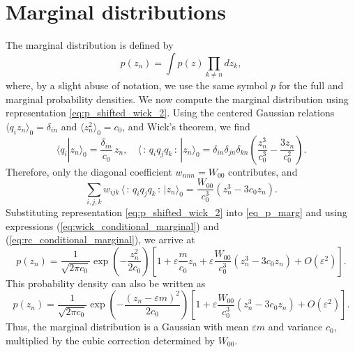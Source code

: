 \documentclass[aps,twocolumn,superscriptaddress]{revtex4-2}
\begin{document}
\section{Marginal distributions}

The marginal distribution is defined by
\begin{equation}
p(z_n)=\int p(z)\prod_{k\ne n}dz_k,
\label{eq_p_marg}
\end{equation}
where, by a slight abuse of notation, we use the same symbol \(p\) for the full and marginal probability densities. We now compute the marginal distribution using representation \eqref{eq:p_shifted_wick_2}.
Using the centered Gaussian relations $\langle q_i z_n\rangle_0=\delta_{in}$ and $\langle z_n^2\rangle_0=c_0$,
and Wick's theorem, we find
\begin{equation}
\langle q_i | z_n\rangle_0=\frac{\delta_{in}}{c_0}\,z_n, \quad
\langle \,{:}\,q_iq_jq_k\,{:} \,| z_n\rangle_0
=
\delta_{in}\delta_{jn}\delta_{kn}
\left(
\frac{z_n^3}{c_0^3}-\frac{3z_n}{c_0^2}
\right).
\label{eq:wick_conditional_marginal}
\end{equation}
Therefore, only the diagonal coefficient \(w_{nnn}=W_{00}\) contributes, and
\begin{equation}
\sum_{i,j,k} w_{ijk}\,
\langle \,{:}\,q_iq_jq_k\,{:}\, | z_n\rangle_0
=
\frac{W_{00}}{c_0^3}
\left( z_n^3-3c_0 z_n \right).
\label{eq:rc_conditional_marginal}
\end{equation}
Substituting representation \eqref{eq:p_shifted_wick_2} into \eqref{eq_p_marg} and using expressions (\ref{eq:wick_conditional_marginal}) and (\ref{eq:rc_conditional_marginal}), we arrive at
\begin{equation}
p(z_n) =
\frac{1}{\sqrt{2\pi c_0}}
\exp\!\left(-\frac{z_n^2}{2c_0}\right)
\left[
1+\varepsilon\frac{m}{c_0}z_n+\varepsilon \frac{W_{00}}{c_0^3}
\left(z_n^3-3c_0 z_n\right) +O(\varepsilon^2)
\right].
\label{eq:marginal_shifted_final_simplifiedSM}
\end{equation}
This probability density can also be written as
\begin{equation}
p(z_n) =
\frac{1}{\sqrt{2\pi c_0}}
\exp\!\left(-\frac{(z_n-\varepsilon m)^2}{2c_0}\right)
\left[
1+\varepsilon \frac{W_{00}}{c_0^3}
\left(z_n^3-3c_0 z_n\right) +O(\varepsilon^2)
\right].
\label{eq:marginal_shifted_final_simplifiedBSM}
\end{equation}
Thus, the marginal distribution is a Gaussian with mean \(\varepsilon m\) and variance \(c_0\), multiplied by the cubic correction determined by \(W_{00}\).
\end{document}
